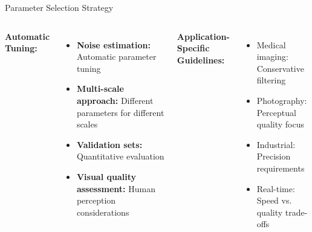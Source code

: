 \documentclass[aspectratio=169,10pt]{beamer}
\begin{document}
\begin{frame}{Parameter Selection Strategy}
\begin{columns}
\textbf{Automatic Tuning:}
\begin{itemize}
\item \textbf{Noise estimation:} Automatic parameter tuning
\item \textbf{Multi-scale approach:} Different parameters for different scales
\item \textbf{Validation sets:} Quantitative evaluation
\item \textbf{Visual quality assessment:} Human perception considerations
\end{itemize}

\textbf{Application-Specific Guidelines:}
\begin{itemize}
\item Medical imaging: Conservative filtering
\item Photography: Perceptual quality focus
\item Industrial: Precision requirements
\item Real-time: Speed vs. quality trade-offs
\end{itemize}
\end{columns}
\end{frame}
\end{document}
